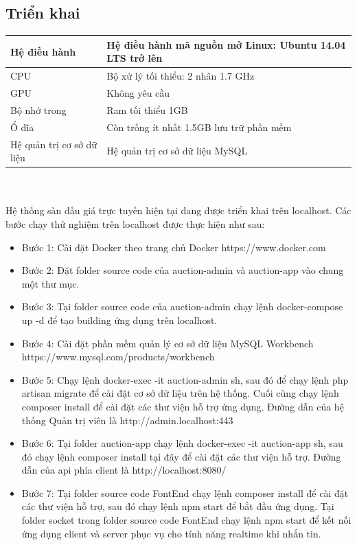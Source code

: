 \documentclass{article}
\begin{document}
\subsection{Triển khai}
    \tabletail{\hline}
    \label{bang416}
    \begin{supertabular}{| p{.30\textwidth}|p{.60\textwidth}|} 
    \hline
        Hệ điều hành& Hệ điều hành mã nguồn mở Linux: Ubuntu 14.04 LTS trở lên\\\hline
        CPU& Bộ xử lý tối thiểu: 2 nhân 1.7 GHz\\\hline
        GPU& Không yêu cầu\\\hline
        Bộ nhớ trong& Ram tối thiểu 1GB \\\hline
        Ổ đĩa& Còn trống ít nhất 1.5GB lưu trữ phần mềm \\\hline
        Hệ quản trị cơ sở dữ liệu&Hệ quản trị cơ sở dữ liệu MySQL \\\hline
    \end{supertabular}\\
\\
Hệ thống sàn đấu giá trực tuyến hiện tại đang được triển khai trên localhost. Các bước chạy thử nghiệm trên localhost được thực hiện như sau: 
\begin{itemize}
    \item Bước 1: Cài đặt Docker theo trang chủ Docker https://www.docker.com
    \item Bước 2: Đặt folder source code của auction-admin và auction-app vào chung một thư mục. 
    \item Bước 3: Tại folder source code của auction-admin chạy lệnh docker-compose up -d để tạo building ứng dụng trên localhost.
    \item Bước 4: Cài đặt phần mềm quản lý cơ sở dữ liệu MySQL Workbench https://www.mysql.com/products/workbench
    \item Bước 5: Chạy lệnh docker-exec -it auction-admin sh, sau đó để chạy lệnh php artisan migrate để cài đặt cơ sở dữ liệu trên hệ thống. Cuối cùng chạy lệnh composer install để cài đặt các thư viện hỗ trợ ứng dụng. Đường dẫn của hệ thống Quản trị viên là http://admin.localhost:443
    \item Bước 6: Tại folder auction-app chạy lệnh docker-exec -it auction-app sh, sau đó chạy lệnh composer install tại đây để cài đặt các thư viện hỗ trợ. Đường dẫn của api phía client là http://localhost:8080/
    \item Bước 7: Tại folder source code FontEnd chạy lệnh composer install để cài đặt các thư viện hỗ trợ, sau đó chạy lệnh npm start để bắt đầu ứng dụng. Tại folder socket trong folder source code FontEnd chạy lệnh npm start để kết nối ứng dụng client và server phục vụ cho tính năng realtime khi nhắn tin.
\end{itemize}
\newpage
\end{document}
